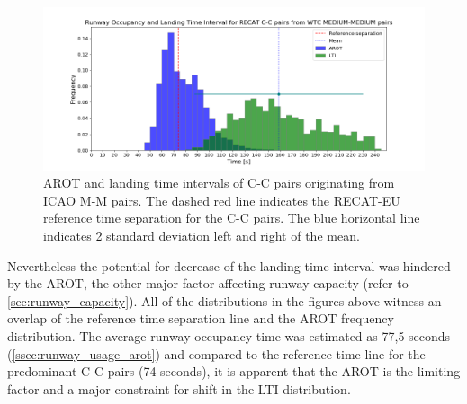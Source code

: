 \begin{figure}[h]
    \centering
    \includegraphics[width=1\textwidth]{graphics/fig_CC_from_MM_pairs_time_sep.png}
    \caption[AROT and LTI of C-C pairs originating from ICAO M-M pairs]{AROT and landing time intervals of C-C pairs originating from ICAO M-M pairs. The dashed red line indicates the RECAT-EU reference time separation for the C-C pairs. The blue horizontal line indicates 2 standard deviation left and right of the mean.}
    \label{fig:CC_from_MM_pairs_time_sep}
\end{figure}

Nevertheless the potential for decrease of the landing time interval was hindered by the AROT, the other major factor affecting runway capacity (refer to \ref{sec:runway_capacity}). All of the distributions in the figures above witness an overlap of the reference time separation line and the AROT frequency distribution. The average runway occupancy time was estimated as 77,5 seconds (\ref{ssec:runway_usage_arot}) and compared to the reference time line for the predominant C-C pairs (74 seconds), it is apparent that the AROT is the limiting factor and a major constraint for shift in the LTI distribution.









